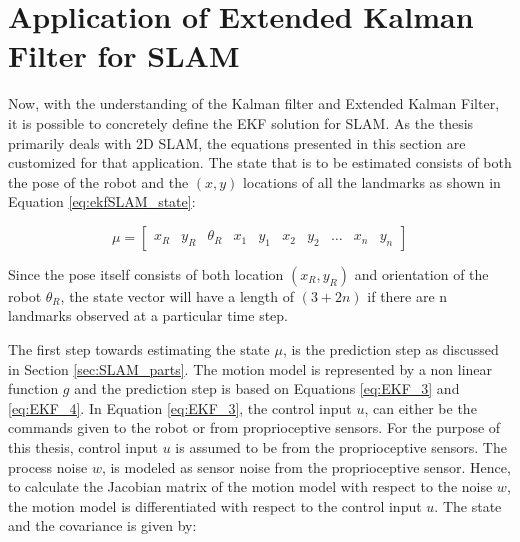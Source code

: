 \section{Application of Extended Kalman Filter for SLAM}
\label{sec:EKF_SLAM}

Now, with the understanding of the Kalman filter and Extended Kalman Filter, it is possible to concretely define the EKF solution for SLAM. As the thesis primarily deals with 2D SLAM, the equations presented in this section are customized for that application. The state that is to be estimated consists of both the pose of the robot and the $ (x,y) $ locations of all the landmarks as shown in Equation \ref{eq:ekfSLAM_state}:

\begin{equation}
\mu = 
\begin{bmatrix}
x_R & y_R&\theta_R& x_1& y_1& x_2& y_2& \dots& x_n& y_n
\end{bmatrix}
\label{eq:ekfSLAM_state}
\end{equation}

Since the pose itself consists of both location $ (x_R,y_R) $ and orientation of the robot $ \theta_R $, the state vector will have a length of $ (3+2n) $ if there are n landmarks observed at a particular time step.

The first step towards estimating the state $ \mu $, is the prediction step as discussed in Section \ref{sec:SLAM_parts}. The motion model is represented by a non linear function $ g $ and the prediction step is based on Equations \ref{eq:EKF_3} and \ref{eq:EKF_4}. In Equation \ref{eq:EKF_3}, the control input $ u $, can either be the commands given to the robot or from proprioceptive sensors. For the purpose of this thesis, control input $ u $ is assumed to be from the proprioceptive sensors. The process noise $ w $, is modeled as sensor noise from the proprioceptive sensor. Hence, to calculate the Jacobian matrix of the motion model with respect to the noise $ w $, the motion model is differentiated with respect to the control input $ u $. The state and the covariance is given by:


